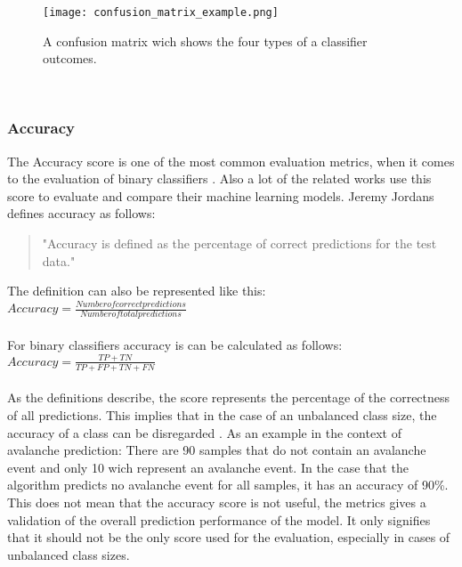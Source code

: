 \documentclass[../masterarbeit.tex]{subfiles}
\begin{document}
\begin{figure}[h]
    \centering
    \texttt{[image: confusion\_matrix\_example.png]}
    \caption{A confusion matrix wich shows the four types of a classifier outcomes.}
\end{figure} \\









\subsubsection{Accuracy}
The Accuracy score is one of the most common evaluation metrics, when it comes to the evaluation of binary classifiers \textcite[]{Kartik_evaluation:2022}. Also a lot of the related works use this score to evaluate and compare their machine learning models. Jeremy Jordans defines accuracy as follows:
\begin{quote}
	"Accuracy is defined as the percentage of correct predictions for the test data." \autocite{jeremyjordan_evaluation:2022}
\end{quote}
The definition can also be represented like this: 
\\
\(Accuracy = \frac{Number of correct predictions}{Number of total predictions} \) \hfill \textcite[]{Google_Acurracy:2022} \\~\\
For binary classifiers accuracy is can be calculated as follows: \\
\(Accuracy = \frac{TP + TN}{TP + FP + TN + FN} \) \hfill \textcite[]{Kartik_evaluation:2022} \\~\\
As the definitions describe, the score represents the percentage of the correctness of all predictions. This implies that in the case of an unbalanced class size, the accuracy of a class can be disregarded \textcite[]{Kartik_evaluation:2022}. As an example in the context of avalanche prediction: There are 90 samples that do not contain an avalanche event and only 10 wich represent an avalanche event. In the case that the algorithm predicts no avalanche event for all samples, it has an accuracy of 90\%. \\
This does not mean that the accuracy score is not useful, the metrics gives a validation of the overall prediction performance of the model. It only signifies that it should not be the only score used for the evaluation, especially in cases of unbalanced class sizes. \autocite[]{Google_Acurracy:2022} \\~\\
\end{document}
